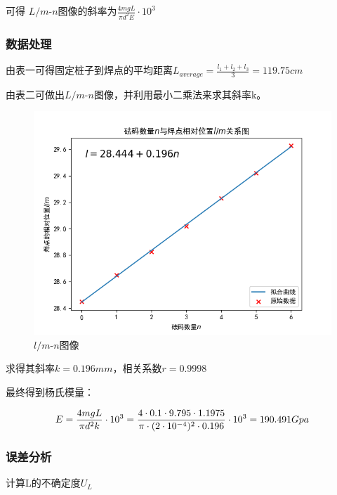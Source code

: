 \documentclass[a4paper,UTF8]{ctexart}
\begin{document}
可得 $L /m$-$n$图像的斜率为$\frac{4mgL}{\pi d^2 E} \cdot 10^{3}$

\subsubsection{数据处理}

由表一可得固定桩子到焊点的平均距离$L_{average} = \frac{l_1 + l_2 + l_3}{3} = 119.75cm$

由表二可做出$L /m$-$n$图像，并利用最小二乘法来求其斜率k。

\newpage

\begin{figure}[htb]
    \centering
    \includegraphics[scale=0.5]{Figure_1.png}
    \caption{$l/m$-$n$图像}
\end{figure}

求得其斜率$k = 0.196 mm$，相关系数$r = 0.9998$

最终得到杨氏模量：

\begin{equation}
    E = \frac{4mgL}{\pi d^2 k} \cdot 10^{3} \\
    = \frac{4 \cdot 0.1 \cdot 9.795 \cdot 1.1975}{\pi \cdot (2 \cdot 10^{-4})^{2} \cdot 0.196} \cdot 10^3 \\
    = 190.491 Gpa
\end{equation}

\subsubsection{误差分析}

计算L的不确定度$U_L$
\end{document}
